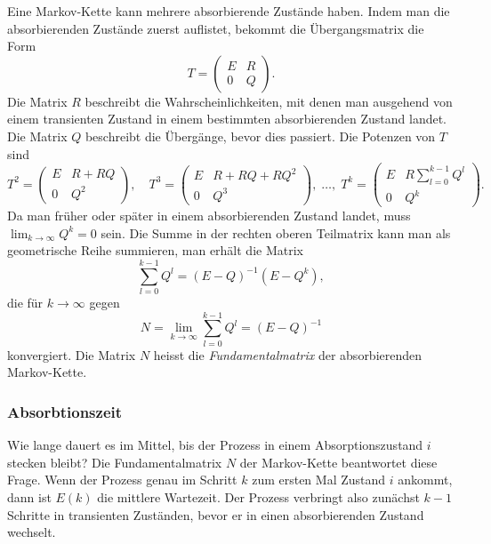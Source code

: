 Eine Markov-Kette kann mehrere absorbierende Zustände haben.
Indem man die absorbierenden Zustände zuerst auflistet, bekommt die 
Übergangsmatrix die Form
\[
T=
\left(
\begin{array}{c|c}
E&R\\
\hline
0&Q
\end{array}
\right).
\]
Die Matrix $R$ beschreibt die Wahrscheinlichkeiten, mit denen man
ausgehend von einem transienten Zustand
in einem bestimmten absorbierenden Zustand landet.
Die Matrix $Q$ beschreibt die Übergänge, bevor dies passiert.
Die Potenzen von $T$ sind
\[
T^2
=
\left(
\begin{array}{c|c}
E&R+RQ \\
\hline
0&Q^2
\end{array}
\right),
\quad
T^3
=
\left(
\begin{array}{c|c}
E&R+RQ+RQ^2 \\
\hline
0&Q^3
\end{array}
\right),
\;
\dots,
\;
T^k
=
\left(
\begin{array}{c|c}
E&\displaystyle R\sum_{l=0}^{k-1} Q^l \\
\hline
0&Q^k
\end{array}
\right).
\]
Da man früher oder später in einem absorbierenden Zustand landet,
muss $\lim_{k\to\infty} Q^k=0$ sein.
Die Summe in der rechten oberen Teilmatrix kann man als geometrische
Reihe summieren, man erhält die Matrix
\[
\sum_{l=0}^{k-1} Q^l = (E-Q)^{-1}(E-Q^k),
\]
die für $k\to\infty$ gegen
\[
N
=
\lim_{k\to\infty} \sum_{l=0}^{k-1} Q^l
=
(E-Q)^{-1}
\]
konvergiert.
Die Matrix $N$ heisst die {\em Fundamentalmatrix} der absorbierenden
Markov-Kette.
%

\subsubsection{Absorbtionszeit}
Wie lange dauert es im Mittel, bis der Prozess in einem
Absorptionszustand $i$ stecken bleibt?
Die Fundamentalmatrix $N$ der Markov-Kette beantwortet diese
Frage.
Wenn der Prozess genau im Schritt $k$ zum ersten Mal Zustand $i$
ankommt, dann ist $E(k)$ die mittlere Wartezeit.
Der Prozess verbringt also zunächst $k-1$ Schritte in transienten
Zuständen, bevor er in einen absorbierenden Zustand wechselt.

